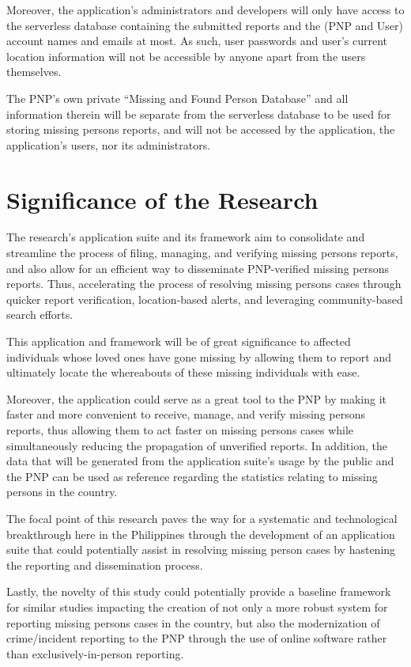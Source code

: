 Moreover, the application’s administrators and developers will only have access to the serverless database containing the submitted reports and the (PNP and User) account names and emails at most. As such, user passwords and user’s current location information will not be accessible by anyone apart from the users themselves. 

The PNP’s own private “Missing and Found Person Database” and all information therein will be separate from the serverless database to be used for storing missing persons reports, and will not be accessed by the application, the application’s users, nor its administrators.

\section{Significance of the Research}
\label{sec:significance}
The research’s application suite and its framework aim to consolidate and streamline the process of filing, managing, and verifying missing persons reports, and also allow for an efficient way to disseminate PNP-verified missing persons reports. Thus, accelerating the process of resolving missing persons cases through quicker report verification, location-based alerts, and leveraging community-based search efforts. 

This application and framework will be of great significance to affected individuals whose loved ones have gone missing by allowing them to report and ultimately locate the whereabouts of these missing individuals with ease.

Moreover, the application could serve as a great tool to the PNP by making it faster and more convenient to receive, manage, and verify missing persons reports, thus allowing them to act faster on missing persons cases while simultaneously reducing the propagation of unverified reports. In addition, the data that will be generated from the application suite’s usage by the public and the PNP can be used as reference regarding the statistics relating to missing persons in the country. 

The focal point of this research paves the way for a systematic and technological breakthrough here in the Philippines through the development of an application suite that could potentially assist in resolving missing person cases by hastening the reporting and dissemination process.

Lastly, the novelty of this study could potentially provide a baseline framework for similar studies impacting the creation of not only a more robust system for reporting missing persons cases in the country, but also the modernization of crime/incident reporting to the PNP through the use of online software rather than exclusively-in-person reporting.


